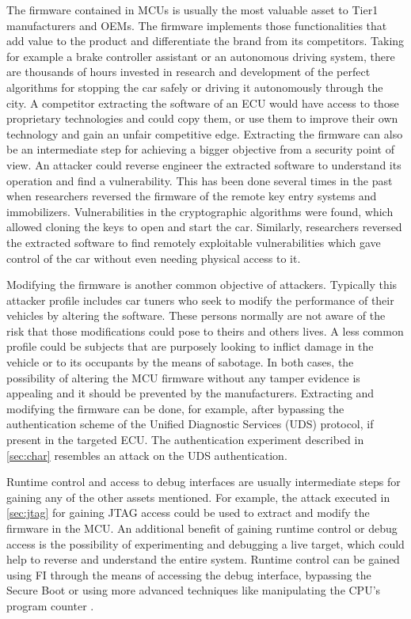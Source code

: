 \documentclass[a4paper, 10pt]{IEEEtran}
\begin{document}
The firmware contained in MCUs is usually the most valuable asset to Tier1 manufacturers and OEMs. The firmware implements those functionalities that add value to the product and differentiate the brand from its competitors. Taking for example a brake controller assistant or an autonomous driving system, there are thousands of hours invested in research and development of the perfect algorithms for stopping the car safely or driving it autonomously through the city. A competitor extracting the software of an ECU would have access to those proprietary technologies and could copy them, or use them to improve their own technology and gain an unfair competitive edge. Extracting the firmware can also be an intermediate step for achieving a bigger objective from a security point of view. An attacker could reverse engineer the extracted software to understand its operation and find a vulnerability. This has been done several times in the past when researchers \cite{garcia_lock_2016,kasper_breaking_2009,verdult_dismantling_2015} reversed the firmware of the remote key entry systems and immobilizers. Vulnerabilities in the cryptographic algorithms were found, which allowed cloning the keys to open and start the car. Similarly, researchers \cite{miller_remote_2015} reversed the extracted software to find remotely exploitable vulnerabilities which gave control of the car without even needing physical access to it.

Modifying the firmware is another common objective of attackers. Typically this attacker profile includes car tuners who seek to modify the performance of their vehicles by altering the software. These persons normally are not aware of the risk that those %
modifications could pose to theirs and others lives. A less common profile could be subjects that are purposely looking to inflict damage in the vehicle or to its occupants by the means of sabotage. In both cases, the possibility of altering the MCU firmware without any tamper evidence is appealing and it should be prevented by the manufacturers. Extracting and modifying the firmware can be done, for example, after bypassing the authentication scheme of the Unified Diagnostic Services (UDS) protocol, if present in the targeted ECU. The authentication experiment described in \autoref{sec:char} resembles an attack on the UDS authentication.

Runtime control and access to debug interfaces are usually intermediate steps for gaining any of the other assets mentioned. For example, the attack executed in \autoref{sec:jtag} for gaining JTAG access could be used to extract and modify the firmware in the MCU. An additional benefit of gaining runtime control or debug access is the possibility of experimenting and debugging a live target, which could help to reverse and understand the entire system. Runtime control can be gained using FI through the means of accessing the debug interface, bypassing the Secure Boot or using more advanced techniques like manipulating the CPU's program counter \cite{timmers_controlling_2016}.
\end{document}
